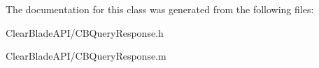 The documentation for this class was generated from the following files\+:\begin{DoxyCompactItemize}
\item 
Clear\+Blade\+A\+P\+I/C\+B\+Query\+Response.\+h\item 
Clear\+Blade\+A\+P\+I/C\+B\+Query\+Response.\+m\end{DoxyCompactItemize}
